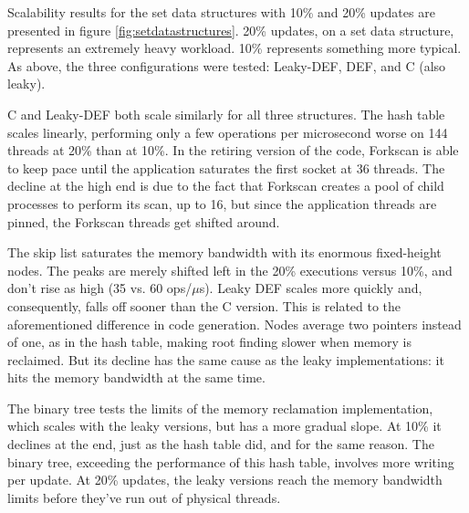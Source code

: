 Scalability results for the set data structures with 10\% and 20\% updates are presented in figure \ref{fig:setdatastructures}.  20\% updates, on a set data structure, represents an extremely heavy workload.  10\% represents something more typical.  As above, the three configurations were tested: Leaky-DEF, DEF, and C (also leaky).


C and Leaky-DEF both scale similarly for all three structures.  The hash table scales linearly, performing only a few operations per microsecond worse on 144 threads at 20\% than at 10\%.  In the retiring version of the code, Forkscan is able to keep pace until the application saturates the first socket at 36 threads.  The decline at the high end is due to the fact that Forkscan creates a pool of child processes to perform its scan, up to 16, but since the application threads are pinned, the Forkscan threads get shifted around.

The skip list saturates the memory bandwidth with its enormous fixed-height nodes.  The peaks are merely shifted left in the 20\% executions versus 10\%, and don't rise as high (35 vs. 60 ops/$\mu$s).  Leaky DEF scales more quickly and, consequently, falls off sooner than the C version.  This is related to the aforementioned difference in code generation.  Nodes average two pointers instead of one, as in the hash table, making root finding slower when memory is reclaimed.  But its decline has the same cause as the leaky implementations: it hits the memory bandwidth at the same time.

The binary tree tests the limits of the memory reclamation implementation, which scales with the leaky versions, but has a more gradual slope.  At 10\% it declines at the end, just as the hash table did, and for the same reason.  The binary tree, exceeding the performance of this hash table, involves more writing per update.  At 20\% updates, the leaky versions reach the memory bandwidth limits before they've run out of physical threads.


